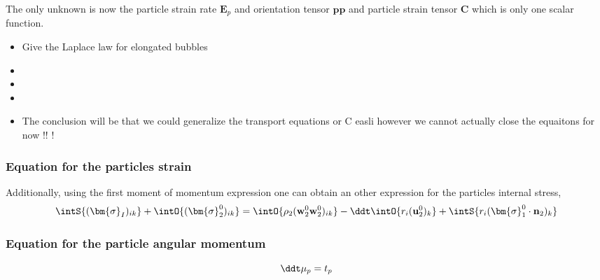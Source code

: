 The only unknown is now the particle strain rate $\textbf{E}_p$ and orientation tensor $\textbf{pp}$ and particle strain tensor \textbf{C} which is only one scalar function. 
\begin{itemize}
    \item Give the Laplace law for elongated bubbles 
    \item {}
    \item {}
    \item {}
    \item The conclusion will be that we could generalize the transport equations or C easli  however we cannot actually close the equaitons for now !! ! 
\end{itemize}

\subsubsection*{Equation for the particles strain}

Additionally, using the first moment of momentum expression one can obtain an other expression for the particles internal stress, 
\begin{equation}
    \intS{ (\bm{\sigma}_I)_{ik}}
    +\intO{ (\bm{\sigma}_2^0)_{ik}}
    = 
    \intO{ \rho_2 
    (\textbf{w}_2^0\textbf{w}_2^0  )_{ik}
    }
    -\ddt \intO{ r_i (\textbf{u}^0_2)_k }
    +\intS{ 
     r_i (\bm{\sigma}_1^0 \cdot \textbf{n}_2)_{k}
    }
\end{equation}

\subsubsection*{Equation for the particle angular momentum}
\begin{equation*}
    \ddt \mu_p = t_p
\end{equation*}